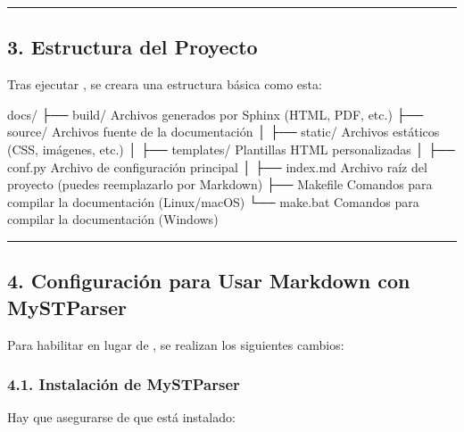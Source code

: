 \documentclass[a4paper,10pt,spanish]{sphinxmanual}
\begin{document}
\bigskip\hrule\bigskip



\subsection{3. Estructura del Proyecto}
\label{\detokenize{configuracion_inicial/003.Creacion_proyecto_Sphinx:estructura-del-proyecto}}
\sphinxAtStartPar
Tras ejecutar , se creara una estructura básica como esta:

\begin{sphinxVerbatim}[commandchars=\\\{\}]
docs/
├── build/                  \PYGZsh{} Archivos generados por Sphinx (HTML, PDF, etc.)
├── source/                 \PYGZsh{} Archivos fuente de la documentación
│   ├── \PYGZus{}static/            \PYGZsh{} Archivos estáticos (CSS, imágenes, etc.)
│   ├── \PYGZus{}templates/         \PYGZsh{} Plantillas HTML personalizadas
│   ├── conf.py             \PYGZsh{} Archivo de configuración principal
│   ├── index.md           \PYGZsh{} Archivo raíz del proyecto (puedes reemplazarlo por Markdown)
├── Makefile                \PYGZsh{} Comandos para compilar la documentación (Linux/macOS)
└── make.bat                \PYGZsh{} Comandos para compilar la documentación (Windows)
\end{sphinxVerbatim}


\bigskip\hrule\bigskip



\subsection{4. Configuración para Usar Markdown con MyST\sphinxhyphen{}Parser}
\label{\detokenize{configuracion_inicial/003.Creacion_proyecto_Sphinx:configuracion-para-usar-markdown-con-myst-parser}}
\sphinxAtStartPar
Para habilitar  en lugar de , se realizan los siguientes cambios:


\subsubsection{4.1. Instalación de MyST\sphinxhyphen{}Parser}
\label{\detokenize{configuracion_inicial/003.Creacion_proyecto_Sphinx:instalacion-de-myst-parser}}
\sphinxAtStartPar
Hay que asegurarse de que  está instalado:
\end{document}

